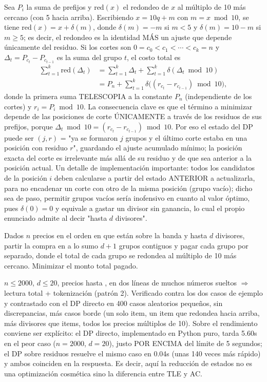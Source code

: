  Sea $P_i$ la suma de prefijos y $\mathrm{red}(x)$ el redondeo de $x$ al múltiplo de 10 más cercano (con 5 hacia arriba). Escribiendo $x = 10q + m$ con $m = x \bmod 10$, se tiene $\mathrm{red}(x) = x + \delta(m)$, donde $\delta(m) = -m$ si $m < 5$ y $\delta(m) = 10 - m$ si $m \ge 5$; es decir, el redondeo es la identidad MÁS un ajuste que depende únicamente del residuo. Si los cortes son $0 = c_0 < c_1 < \cdots < c_k = n$ y $\Delta_t = P_{c_t} - P_{c_{t-1}}$ es la suma del grupo $t$, el costo total es
\begin{align*}
\sum_{t=1}^{k} \mathrm{red}(\Delta_t)
  &= \sum_{t=1}^{k}\Delta_t + \sum_{t=1}^{k}\delta(\Delta_t \bmod 10)\\
  &= P_n + \sum_{t=1}^{k}\delta\big((r_{c_t} - r_{c_{t-1}}) \bmod 10\big),
\end{align*}
donde la primera suma TELESCOPIA a la constante $P_n$ (independiente de los cortes) y $r_i = P_i \bmod 10$. La consecuencia clave es que el término a minimizar depende de las posiciones de corte ÚNICAMENTE a través de los residuos de sus prefijos, porque $\Delta_t \bmod 10 = (r_{c_t} - r_{c_{t-1}}) \bmod 10$. Por eso el estado del DP puede ser $(j, r)$ = "ya se formaron $j$ grupos y el último corte estaba en una posición con residuo $r$", guardando el ajuste acumulado mínimo; la posición exacta del corte es irrelevante más allá de su residuo y de que sea anterior a la posición actual. Un detalle de implementación importante: todos los candidatos de la posición $i$ deben calcularse a partir del estado ANTERIOR a actualizarla, para no encadenar un corte con otro de la misma posición (grupo vacío); dicho sea de paso, permitir grupos vacíos sería inofensivo en cuanto al valor óptimo, pues $\delta(0)=0$ y equivale a gastar un divisor sin ganancia, lo cual el propio enunciado admite al decir "hasta $d$ divisores".


Dados $n$ precios en el orden en que están sobre la banda y hasta $d$ divisores, partir la compra en a lo sumo $d+1$ grupos contiguos y pagar cada grupo por separado, donde el total de cada grupo se redondea al múltiplo de 10 más cercano. Minimizar el monto total pagado.

 $n \le 2000$, $d \le 20$, precios hasta , en dos líneas de muchos números sueltos $\Rightarrow$ lectura total + tokenización (patrón 2). Verificado contra los dos casos de ejemplo y contrastado con el DP directo  en 400 casos aleatorios pequeños, sin discrepancias, más casos borde (un solo item, un item que redondea hacia arriba, más divisores que items, todos los precios múltiplos de 10). Sobre el rendimiento conviene ser explícito: el DP directo, implementado en Python puro, tarda \aprox{}5.60s en el peor caso ($n=2000$, $d=20$), justo POR ENCIMA del límite de 5 segundos; el DP sobre residuos resuelve el mismo caso en \aprox{}0.04s (unas 140 veces más rápido) y ambos coinciden en la respuesta. Es decir, aquí la reducción de estados no es una optimización cosmética sino la diferencia entre TLE y AC.

